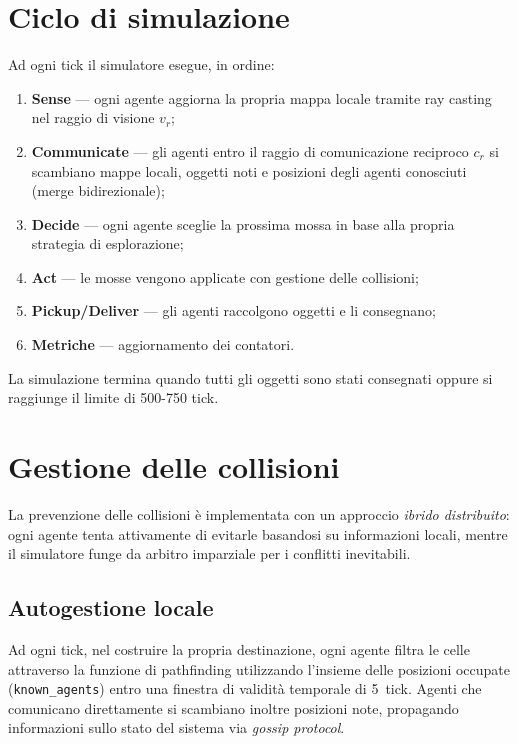 \section{Ciclo di simulazione}

Ad ogni tick il simulatore esegue, in ordine:

\begin{enumerate}
  \item \textbf{Sense} --- ogni agente aggiorna la propria mappa locale tramite ray casting
        nel raggio di visione $v_r$;
  \item \textbf{Communicate} --- gli agenti entro il raggio di comunicazione reciproco
        $c_r$ si scambiano mappe locali, oggetti noti e posizioni degli agenti conosciuti
        (merge bidirezionale);
  \item \textbf{Decide} --- ogni agente sceglie la prossima mossa in base alla propria
        strategia di esplorazione;
  \item \textbf{Act} --- le mosse vengono applicate con gestione delle collisioni;
  \item \textbf{Pickup/Deliver} --- gli agenti raccolgono oggetti e li consegnano;
  \item \textbf{Metriche} --- aggiornamento dei contatori.
\end{enumerate}

La simulazione termina quando tutti gli oggetti sono stati consegnati oppure si raggiunge
il limite di 500-750 tick.

\section{Gestione delle collisioni}

La prevenzione delle collisioni è implementata con un approccio \emph{ibrido distribuito}:
ogni agente tenta attivamente di evitarle basandosi su informazioni locali, mentre il
simulatore funge da arbitro imparziale per i conflitti inevitabili.

\subsection*{Autogestione locale}

Ad ogni tick, nel costruire la propria destinazione, ogni agente filtra le celle
attraverso la funzione di pathfinding utilizzando l'insieme delle posizioni occupate
(\texttt{known\_agents}) entro una finestra di validit\`a temporale di 5~tick.
Agenti che comunicano direttamente si scambiano inoltre posizioni note, propagando
informazioni sullo stato del sistema via \textit{gossip protocol}.

